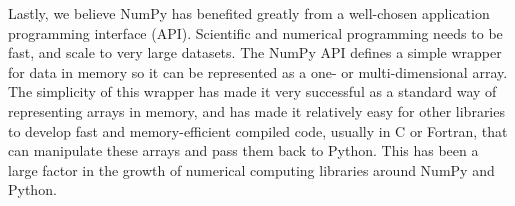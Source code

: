 Lastly, we believe NumPy has benefited greatly from a well-chosen application
programming interface (API).  Scientific and numerical programming needs to be
fast, and scale to very large datasets.  The NumPy API defines a simple wrapper
for data in memory so it can be represented as a one- or multi-dimensional
array.  The simplicity of this wrapper has made it very successful as a
standard way of representing arrays in memory, and has made it relatively easy
for other libraries to develop fast and memory-efficient compiled code, usually
in C or Fortran, that can manipulate these arrays and pass them back to Python.
This has been a large factor in the growth of numerical computing libraries
around NumPy and Python.


%
%
%
%
%
%


